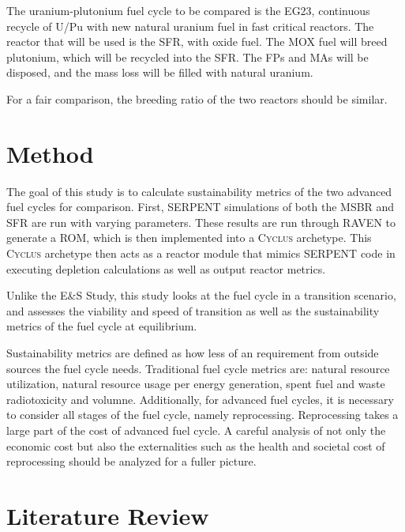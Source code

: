 \documentclass{article}
\newcommand{\Cyclus}{\textsc{Cyclus}\xspace}%
\begin{document}
The uranium-plutonium fuel cycle to be compared is the 
EG23, continuous recycle of U/Pu with new natural uranium
fuel in fast critical reactors. The reactor that will be used
is the \gls{SFR}, with oxide fuel. The \gls{MOX} fuel will 
breed plutonium, which will be recycled into the \gls{SFR}.
The \glspl{FP} and \glspl{MA} will be disposed, and the 
mass loss will be filled with natural uranium.

For a fair comparison, the breeding ratio of the two
reactors should be similar.

\section{Method}

The goal of this study is to calculate sustainability
metrics of the two advanced fuel cycles for comparison.
First, SERPENT simulations of both the \gls{MSBR} and \gls{SFR}
are run with varying parameters. These results are run
through RAVEN \cite{rabiti_mathematical_2013} to generate
a \gls{ROM}, which is then implemented into a \Cyclus
archetype. This \Cyclus archetype then acts as a reactor
module that mimics SERPENT code in executing depletion
calculations as well as output reactor metrics.

Unlike the E\&S Study, this study looks at the 
fuel cycle in a transition scenario, and assesses
the viability and speed of transition as well as
the sustainability metrics of the fuel cycle at equilibrium.

Sustainability metrics are defined as how less of an requirement
from outside sources the fuel cycle needs. Traditional fuel cycle
metrics are: natural resource utilization, natural resource
usage per energy generation, spent fuel and waste radiotoxicity
and volumne.  Additionally, for advanced fuel cycles,
it is necessary to consider all stages of the fuel cycle,
namely reprocessing. Reprocessing takes a large part of the 
cost of advanced fuel cycle. A careful analysis of not only
the economic cost but also the externalities such as the health and societal cost of 
reprocessing should be analyzed for a fuller picture.


\section{Literature Review}
\end{document}
